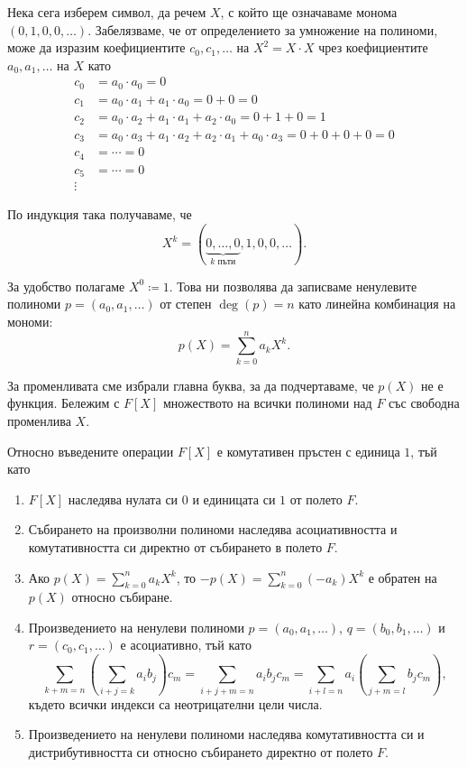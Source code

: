 \documentclass[
  headings=standardclasses,
  bibliography=totocnumbered,
]{scrartcl}
\begin{document}
Нека сега изберем символ, да речем \( X \), с който ще означаваме монома \( (0, 1, 0, 0, \ldots) \). Забелязваме, че от определението за умножение на полиноми, може да изразим коефициентите \( c_0, c_1, \ldots \) на \( X^2 = X \cdot X \) чрез коефициентите \( a_0, a_1, \ldots \) на \( X \) като
\begin{align*}
  c_0 &= a_0 \cdot a_0 = 0 \\
  c_1 &= a_0 \cdot a_1 + a_1 \cdot a_0 = 0 + 0 = 0 \\
  c_2 &= a_0 \cdot a_2 + a_1 \cdot a_1 + a_2 \cdot a_0 = 0 + 1 + 0 = 1 \\
  c_3 &= a_0 \cdot a_3 + a_1 \cdot a_2 + a_2 \cdot a_1 + a_0 \cdot a_3 = 0 + 0 + 0 + 0 = 0 \\
  c_4 &= \cdots = 0 \\
  c_5 &= \cdots = 0 \\
  \vdots
\end{align*}

По индукция така получаваме, че
\begin{equation*}
  X^k = (\underbrace{0, \ldots, 0}_{k \text{ пъти}}, 1, 0, 0, \ldots).
\end{equation*}

За удобство полагаме \( X^0 \coloneqq 1 \). Това ни позволява да записваме ненулевите полиноми \( p = (a_0, a_1, \ldots) \) от степен \( \deg(p) = n \) като линейна комбинация на мономи:
\begin{equation*}
  p(X) = \sum_{k=0}^n a_k X^k.
\end{equation*}

За променливата сме избрали главна буква, за да подчертаваме, че \( p(X) \) не е функция. Бележим с \( F[X] \) множеството на всички полиноми над \( F \) със свободна променлива \( X \).

Относно въведените операции \( F[X] \) е комутативен пръстен с единица \( 1 \), тъй като
\begin{enumerate}
  \item \( F[X] \) наследява нулата си \( 0 \) и единицата си \( 1 \) от полето \( F \).
  \item Събирането на произволни полиноми наследява асоциативността и комутативността си директно от събирането в полето \( F \).
  \item Ако \( p(X) = \sum_{k=0}^n a_k X^k \), то \( -p(X) = \sum_{k=0}^n (-a_k) X^k \) е обратен на \( p(X) \) относно събиране.
  \item Произведението на ненулеви полиноми \( p = (a_0, a_1, \ldots) \), \( q = (b_0, b_1, \ldots) \) и \( r = (c_0, c_1, \ldots) \) е асоциативно, тъй като
  \begin{equation*}
    \sum_{k+m=n} \left(\sum_{i+j=k} a_i b_j \right) c_m
    =
    \sum_{i+j+m=n} a_i b_j c_m
    =
    \sum_{i+l=n} a_i \left( \sum_{j+m=l} b_j c_m \right),
  \end{equation*}
  където всички индекси са неотрицателни цели числа.
  \item Произведението на ненулеви полиноми наследява комутативността си и дистрибутивността си относно събирането директно от полето \( F \).
\end{enumerate}
\end{document}
